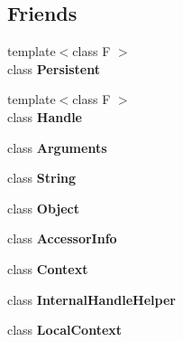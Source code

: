 \subsection*{Friends}
\begin{DoxyCompactItemize}
\item 
\hypertarget{classv8_1_1_local_afaadbbd2553180545a4e018c3eeac71e}{}{\footnotesize template$<$class F $>$ }\\class {\bfseries Persistent}\label{classv8_1_1_local_afaadbbd2553180545a4e018c3eeac71e}

\item 
\hypertarget{classv8_1_1_local_a67ca1a2d91273eaf85fb3d23ba8ce984}{}{\footnotesize template$<$class F $>$ }\\class {\bfseries Handle}\label{classv8_1_1_local_a67ca1a2d91273eaf85fb3d23ba8ce984}

\item 
\hypertarget{classv8_1_1_local_acbd2a21b98cd2cb694fd02340724b625}{}class {\bfseries Arguments}\label{classv8_1_1_local_acbd2a21b98cd2cb694fd02340724b625}

\item 
\hypertarget{classv8_1_1_local_a7fb804f7dc96dd9f705c84095f37f1ca}{}class {\bfseries String}\label{classv8_1_1_local_a7fb804f7dc96dd9f705c84095f37f1ca}

\item 
\hypertarget{classv8_1_1_local_a0720b5f434e636e22a3ed34f847eec57}{}class {\bfseries Object}\label{classv8_1_1_local_a0720b5f434e636e22a3ed34f847eec57}

\item 
\hypertarget{classv8_1_1_local_aa6da8bc2cce791f1f1358707f98c45d1}{}class {\bfseries Accessor\+Info}\label{classv8_1_1_local_aa6da8bc2cce791f1f1358707f98c45d1}

\item 
\hypertarget{classv8_1_1_local_ac26c806e60ca4a0547680edb68f6e39b}{}class {\bfseries Context}\label{classv8_1_1_local_ac26c806e60ca4a0547680edb68f6e39b}

\item 
\hypertarget{classv8_1_1_local_a4d886c8e6d4c47ae9d59f6d878048580}{}class {\bfseries Internal\+Handle\+Helper}\label{classv8_1_1_local_a4d886c8e6d4c47ae9d59f6d878048580}

\item 
\hypertarget{classv8_1_1_local_ae34f528093f2fad464ce37f6e64c763d}{}class {\bfseries Local\+Context}\label{classv8_1_1_local_ae34f528093f2fad464ce37f6e64c763d}

\end{DoxyCompactItemize}


